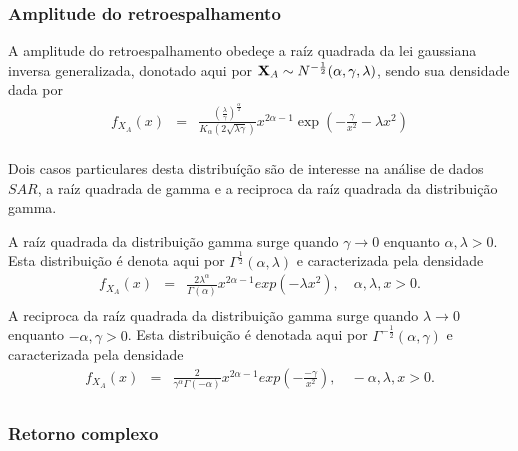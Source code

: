 \documentclass[10pt,a4paper]{article}
\begin{document}
\subsubsection{Amplitude do retroespalhamento}

A amplitude do retroespalhamento obedeçe a raíz quadrada da lei gaussiana inversa generalizada, donotado aqui por ${\bf X}_{A}\sim N^{-\frac{1}{2}}(\alpha,\gamma,\lambda)$, sendo sua densidade dada por
\begin{equation}\label{sec62eqn1}
\begin{array}{ccc}
	f_{X_{A}}(x)&=&\frac{\left(\frac{\lambda}{\gamma}\right)^{\frac{\alpha}{2}}}{K_{\alpha}(2\sqrt{\lambda\gamma})}x^{2\alpha-1}\exp\left(-\frac{\gamma}{x^2}-\lambda x^2\right) \\
\end{array}
\end{equation}

Dois casos particulares desta distribuíção são de interesse na análise de dados $SAR$, a raíz quadrada de gamma e a reciproca da raíz quadrada da distribuição gamma. 

A raíz quadrada da distribuição gamma surge quando $\gamma \rightarrow 0$ enquanto $\alpha,\lambda>0$. Esta distribuição é denota aqui por $\Gamma^{\frac{1}{2}}(\alpha,\lambda)$ e caracterizada pela densidade 
\begin{equation}\label{sec62eqn2}
\begin{array}{ccc}
	f_{X_{A}}(x)&=&\frac{2\lambda^{\alpha}}{\Gamma(\alpha)}x^{2\alpha-1}exp(-\lambda x^2), \quad \alpha,\lambda, x>0. \\
\end{array}
\end{equation}
A reciproca da raíz quadrada da distribuição gamma surge quando $\lambda\rightarrow 0$ enquanto $-\alpha,\gamma>0$. Esta distribuição é denotada aqui por $\Gamma^{-\frac{1}{2}}(\alpha,\gamma) $ e caracterizada pela densidade
\begin{equation}\label{sec62eqn3}
\begin{array}{ccc}
	f_{X_{A}}(x)&=&\frac{2}{\gamma^{\alpha}\Gamma(-\alpha)}x^{2\alpha-1}exp(-\frac{-\gamma}{x^2}), \quad -\alpha,\lambda, x>0. \\
\end{array}
\end{equation}

\subsubsection{Retorno complexo}
\end{document}
